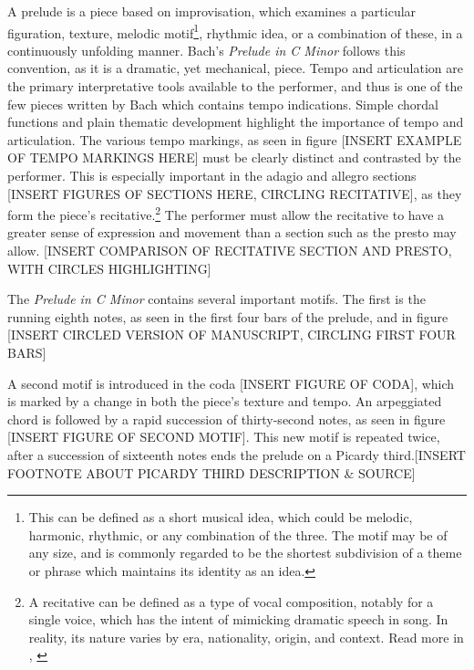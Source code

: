A prelude is a piece based on improvisation, which examines a particular figuration, texture, melodic motif\autocite{Drabkin_2001}\footnote{This can be defined as a short musical idea, which could be melodic, harmonic, rhythmic, or any combination of the three. The motif may be of any size, and is commonly regarded to be the shortest subdivision of a theme or phrase which maintains its identity as an idea.}, rhythmic idea, or a combination of these, in a continuously unfolding manner. Bach's \textit{Prelude in C Minor} follows this convention, as it is a dramatic, yet mechanical, piece. Tempo and articulation are the primary interpretative tools available to the performer, and thus is one of the few pieces written by Bach which contains tempo indications. Simple chordal functions and plain thematic development highlight the importance of tempo and articulation. The various tempo markings, as seen in figure [INSERT EXAMPLE OF TEMPO MARKINGS HERE] must be clearly distinct and contrasted by the performer. This is especially important in the adagio and allegro sections [INSERT FIGURES OF SECTIONS HERE, CIRCLING RECITATIVE], as they form the piece's recitative.\footnote{A recitative can be defined as a type of vocal composition, notably for a single voice, which has the intent of mimicking dramatic speech in song. In reality, its nature varies by era, nationality, origin, and context. Read more in \citeauthor{Monson_Westrup_Budden_2001}, \citeyear{Monson_Westrup_Budden_2001}} The performer must allow the recitative to have a greater sense of expression and movement than a section such as the presto may allow. [INSERT COMPARISON OF RECITATIVE SECTION AND PRESTO, WITH CIRCLES HIGHLIGHTING] 

The \textit{Prelude in C Minor} contains several important motifs. The first is the running eighth notes, as seen in the first four bars of the prelude, and in figure [INSERT CIRCLED VERSION OF MANUSCRIPT, CIRCLING FIRST FOUR BARS]

%

A second motif is introduced in the coda [INSERT FIGURE OF CODA], which is marked by a change in both the piece's texture and tempo. An arpeggiated chord is followed by a rapid succession of thirty-second notes, as seen in figure [INSERT FIGURE OF SECOND MOTIF]. This new motif is repeated twice, after a succession of sixteenth notes ends the prelude on a Picardy third.[INSERT FOOTNOTE ABOUT PICARDY THIRD DESCRIPTION \& SOURCE]
%
%

